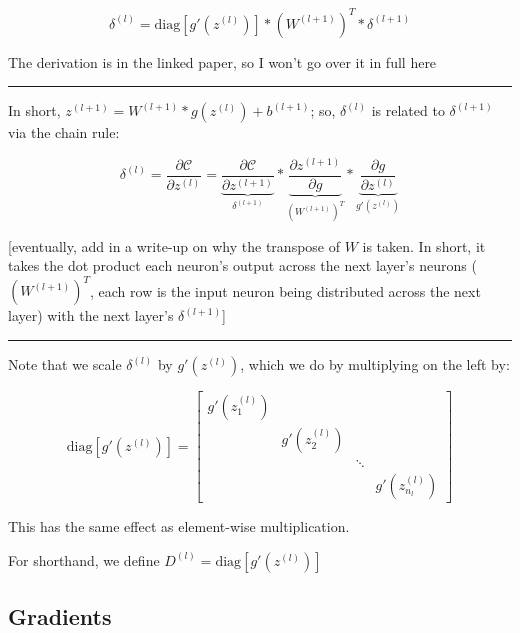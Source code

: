 \documentclass[
]{book}
\begin{document}
\[\delta^{(l)} = \text{diag} \left[g'\left(z^{(l)}\right)\right] * \left(W^{(l + 1)}\right)^T * \delta^{(l + 1)}\]

The derivation is in the linked paper, so I won't go over it in full here

\begin{center}\rule{0.5\linewidth}{0.5pt}\end{center}

In short, \(z^{(l + 1)} = W^{(l + 1)} * g\left(z^{(l)}\right) + b^{(l + 1)}\); so, \(\delta^{(l)}\) is related to \(\delta^{(l + 1)}\) via the chain rule:

\[\delta^{(l)} = \frac{\partial \mathcal{C}}{\partial z^{(l)}} = \underbrace{\frac{\partial \mathcal{C}}{\partial z^{(l + 1)}}}_{\delta^{(l + 1)}} * \underbrace{\frac{\partial z^{(l + 1)}}{\partial g}}_{\left(W^{(l + 1)}\right)^T} * \underbrace{\frac{\partial g}{\partial z^{(l)}}}_{g'\left(z^{(l)}\right)}\]

{[}eventually, add in a write-up on why the transpose of \(W\) is taken. In short, it takes the dot product each neuron's output across the next layer's neurons (\(\left(W^{(l + 1)}\right)^T\), each row is the input neuron being distributed across the next layer) with the next layer's \(\delta^{(l + 1)}\){]}

\begin{center}\rule{0.5\linewidth}{0.5pt}\end{center}

Note that we scale \(\delta^{(l)}\) by \(g'\left(z^{(l)}\right)\), which we do by multiplying on the left by:

\[\text{diag} \left[g'\left(z^{(l)}\right)\right] = \begin{bmatrix} g'\left(z^{(l)}_1\right) &  &  &  \\  & g'\left(z^{(l)}_2\right) &  &  \\  &  & \ddots &  \\  &  &  & g'\left(z^{(l)}_{n_l}\right) \end{bmatrix}\]

This has the same effect as element-wise multiplication.

For shorthand, we define \(D^{(l)} = \text{diag} \left[g'\left(z^{(l)}\right)\right]\)

\hypertarget{gradients-1}{%
\subsection{Gradients}\label{gradients-1}}
\end{document}
